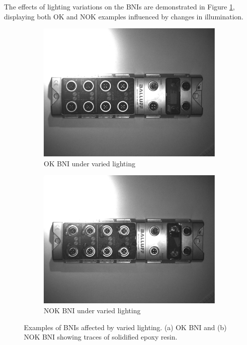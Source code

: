 \documentclass[12pt,DIV14,BCOR12mm,a4paper,footinclude=false,headinclude,parskip=half-,twoside,openright,cleardoublepage=empty,toc=index,bibliography=totoc,listof=totoc]{scrreprt}
\numberwithin{equation}{chapter}
\begin{document}
\begin{enumerate}
	The effects of lighting variations on the BNIs are demonstrated in Figure \ref{fig:lighting}, displaying both OK and NOK examples influenced by changes in illumination.
    \begin{figure}
        \centering
        \begin{subfigure}[b]{0.45\textwidth}
            \centering
            \includegraphics[scale=0.15]{../media/BNI-influence-lighting-OK.png}
            \caption{OK BNI under varied lighting}
        \end{subfigure}
        \hfill
        \begin{subfigure}[b]{0.45\textwidth}
            \centering
            \includegraphics[scale=0.15]{../media/BNI-influence-lighting-NOK.png}
            \caption{NOK BNI under varied lighting}
        \end{subfigure}
        \caption{Examples of BNIs affected by varied lighting. (a) OK BNI and (b) NOK BNI showing traces of solidified epoxy resin.}
        \label{fig:lighting}
    \end{figure}


\end{enumerate}
\end{document}
